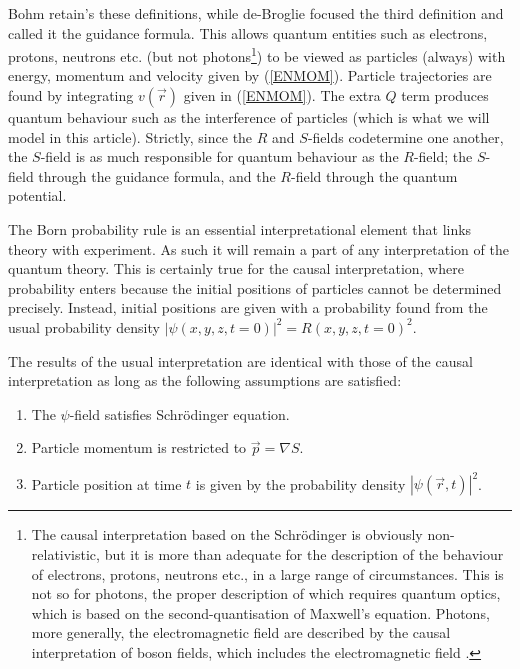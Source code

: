 \documentclass[12pt]{article}       %
\newcommand{\rb}{\mbox{$\vec{r}$}}
\newcommand{\pv}{\mbox{$\vec{p}$}}
\begin{document}
Bohm retain's these definitions, while de-Broglie focused the third definition and called it the guidance  formula. This allows quantum entities such as electrons, protons, neutrons etc. (but not photons\footnote{The causal interpretation based on the Schr\"{o}dinger is obviously non-relativistic, but it is more than adequate for the description of the behaviour of electrons, protons, neutrons etc., in a large range of circumstances. This is not so for photons, the proper description of which requires quantum optics, which is based on the second-quantisation of Maxwell's equation.  Photons, more generally, the electromagnetic field are described by the causal interpretation of boson fields, which includes the electromagnetic field \cite{K85}.}) to be viewed as particles (always) with energy, momentum and velocity given by (\ref{ENMOM}). Particle trajectories are found by integrating $v(\rb)$ given in (\ref{ENMOM}). The extra $Q$ term produces quantum behaviour such as the interference of particles (which is what we will model in this article). Strictly, since the $R$ and $S$-fields codetermine one another, the $S$-field is as much responsible for quantum behaviour as the $R$-field; the $S$-field through the guidance formula, and the $R$-field through the quantum potential.  

The Born probability rule is an essential interpretational element that links theory with experiment. As such it will remain a part  of any interpretation of the quantum theory. This is certainly true for the causal interpretation, where probability enters because the initial positions of particles cannot be determined precisely. Instead, initial positions are given with a probability found from the usual probability density $|\psi(x,y,z,t=0)|^2=R(x,y,z,t=0)^2$.

The results of the usual interpretation are identical with those of the causal interpretation as long as the following assumptions are satisfied:
         \begin{enumerate}
               \item[(1)] The  $\psi$-field satisfies Schr\"{o}dinger equation.
          \item[(2)]  Particle momentum is restricted to $\pv=\nabla S$.
               \item[(3)]   Particle position at time $t$ is given by the
                probability density $|\psi(\rb,t)|^2$.
         \end{enumerate}
\end{document}
